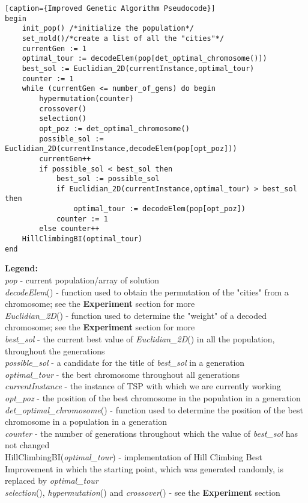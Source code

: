 \documentclass[a4paper]{article}
\begin{document}
\begin{lstlisting}[frame=single][caption={Improved Genetic Algorithm Pseudocode}]
begin
	init_pop() /*initialize the population*/
	set_mold()/*create a list of all the "cities"*/ 
	currentGen := 1
	optimal_tour := decodeElem(pop[det_optimal_chromosome()])
	best_sol := Euclidian_2D(currentInstance,optimal_tour)
	counter := 1
	while (currentGen <= number_of_gens) do begin
		hypermutation(counter)
		crossover()
		selection()
		opt_poz := det_optimal_chromosome()
		possible_sol := Euclidian_2D(currentInstance,decodeElem(pop[opt_poz]))
		currentGen++
		if possible_sol < best_sol then
			best_sol := possible_sol
			if Euclidian_2D(currentInstance,optimal_tour) > best_sol then
				optimal_tour := decodeElem(pop[opt_poz])
			counter := 1
		else counter++
	HillClimbingBI(optimal_tour)
end
\end{lstlisting}
\justify
\textbf{Legend:}\\
{\itshape pop} - current population/array of solution\\
{\itshape decodeElem}() - function used to obtain the permutation of the "cities" from a chromosome; see the \textbf{Experiment} section for more\\
{\itshape Euclidian\_2D}() - function used to determine the "weight" of a decoded chromosome; see the \textbf{Experiment} section for more\\
{\itshape best\_sol} - the current best value of \emph{Euclidian\_2D}() in all the population, throughout the generations\\
{\itshape possible\_sol} - a candidate for the title of {\itshape best\_sol} in a generation\\
{\itshape optimal\_tour} - the best chromosome throughout all generations\\
{\itshape currentInstance} - the instance of TSP with which we are currently working\\
{\itshape opt\_poz} - the position of the best chromosome in the population in a generation\\
{\itshape det\_optimal\_chromosome}() - function used to determine the position of the best chromosome in a population in a generation\\
{\itshape counter} - the number of generations throughout which the value of {\itshape best\_sol} has not changed\\
{\sffamily HillClimbingBI}({\itshape optimal\_tour}) - implementation of Hill Climbing Best Improvement\cite{heuristic} in which the starting point, which was generated randomly, is replaced by {\itshape optimal\_tour}\\
{\itshape selection}(), {\itshape hypermutation}() and {\itshape crossover}() - see the \textbf{Experiment} section
\end{document}
